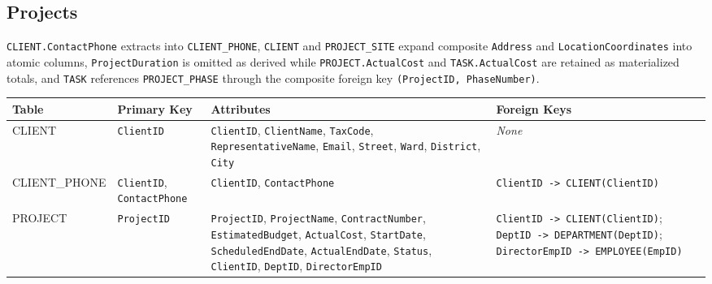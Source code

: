 \documentclass[a4paper,12pt]{report}
\newcounter{none} %
\begin{document}
\subsection{Projects}\label{projects}

\texttt{CLIENT.\allowbreak{}ContactPhone} extracts into \texttt{CLIENT\_\allowbreak{}PHONE}, \texttt{CLIENT} and \texttt{PROJECT\_\allowbreak{}SITE} expand composite \texttt{Address} and \texttt{LocationCoordinates} into atomic columns, \texttt{ProjectDuration} is omitted as derived while \texttt{PROJECT.\allowbreak{}ActualCost} and \texttt{TASK.\allowbreak{}ActualCost} are retained as materialized totals, and \texttt{TASK} references \texttt{PROJECT\_\allowbreak{}PHASE} through the composite foreign key \texttt{(\allowbreak{}\allowbreak{}ProjectID, PhaseNumber)}.

{\def\LTcaptype{none} %
\begin{longtable}[]{@{}
  >{\raggedright\arraybackslash}p{}
  >{\raggedright\arraybackslash}p{}
  >{\raggedright\arraybackslash}p{}
  >{\raggedright\arraybackslash}p{}@{}}
\toprule\noalign{}
\begin{minipage}[b]{\linewidth}\raggedright
Table
\end{minipage} & \begin{minipage}[b]{\linewidth}\raggedright
Primary Key
\end{minipage} & \begin{minipage}[b]{\linewidth}\raggedright
Attributes
\end{minipage} & \begin{minipage}[b]{\linewidth}\raggedright
Foreign Keys
\end{minipage} \\
\midrule\noalign{}
\endhead
\bottomrule\noalign{}
\endlastfoot
CLIENT & \texttt{ClientID} & \texttt{ClientID}, \texttt{ClientName}, \texttt{TaxCode}, \texttt{RepresentativeName}, \texttt{Email}, \texttt{Street}, \texttt{Ward}, \texttt{District}, \texttt{City} & \emph{None} \\
CLIENT\_\allowbreak{}PHONE & \texttt{ClientID}, \texttt{ContactPhone} & \texttt{ClientID}, \texttt{ContactPhone} & \texttt{ClientID -\textgreater{} CLIENT(\allowbreak{}\allowbreak{}ClientID)} \\
PROJECT & \texttt{ProjectID} & \texttt{ProjectID}, \texttt{ProjectName}, \texttt{ContractNumber}, \texttt{EstimatedBudget}, \texttt{ActualCost}, \texttt{StartDate}, \texttt{ScheduledEndDate}, \texttt{ActualEndDate}, \texttt{Status}, \texttt{ClientID}, \texttt{DeptID}, \texttt{DirectorEmpID} & \texttt{ClientID -\textgreater{} CLIENT(\allowbreak{}\allowbreak{}ClientID)}; \texttt{DeptID -\textgreater{} DEPARTMENT(\allowbreak{}\allowbreak{}DeptID)}; \texttt{DirectorEmpID -\textgreater{} EMPLOYEE(\allowbreak{}\allowbreak{}EmpID)} \\

\end{longtable}}
\end{document}
